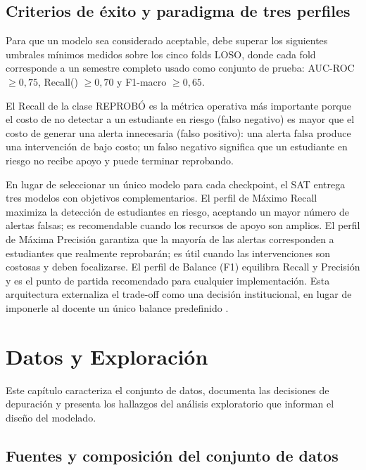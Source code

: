 \documentclass[12pt, letterpaper, openany]{report}
\begin{document}
\section{Criterios de éxito y paradigma de tres perfiles}

Para que un modelo sea considerado aceptable, debe superar los siguientes 
umbrales mínimos medidos sobre los cinco folds LOSO, donde cada fold 
corresponde a un semestre completo usado como conjunto de prueba: 
AUC-ROC $\geq 0{,}75$, Recall() $\geq 0{,}70$ y 
F1-macro $\geq 0{,}65$.

El Recall de la clase REPROBÓ es la métrica operativa más importante porque el costo de no detectar a un estudiante en riesgo (falso negativo) es mayor que el costo de generar una alerta innecesaria (falso positivo): una alerta falsa produce una intervención de bajo costo; un falso negativo significa que un estudiante en riesgo no recibe apoyo y puede terminar reprobando.

En lugar de seleccionar un único modelo para cada checkpoint, el SAT entrega tres modelos con objetivos complementarios. El perfil de Máximo Recall maximiza la detección de estudiantes en riesgo, aceptando un mayor número de alertas falsas; es recomendable cuando los recursos de apoyo son amplios. El perfil de Máxima Precisión garantiza que la mayoría de las alertas corresponden a estudiantes que realmente reprobarán; es útil cuando las intervenciones son costosas y deben focalizarse. El perfil de Balance (F1) equilibra Recall y Precisión y es el punto de partida recomendado para cualquier implementación. Esta arquitectura externaliza el trade-off como una decisión institucional, en lugar de imponerle al docente un único balance predefinido \cite{Whitehill2017}.

\chapter{Datos y Exploración}
\label{chap:datos}

Este capítulo caracteriza el conjunto de datos, documenta las decisiones de depuración y presenta los hallazgos del análisis exploratorio que informan el diseño del modelado.

\section{Fuentes y composición del conjunto de datos}
\end{document}
